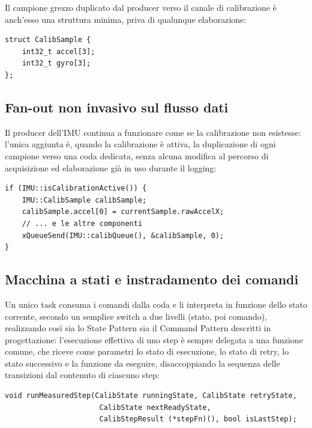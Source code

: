 Il campione grezzo duplicato dal producer verso il canale di calibrazione è
anch'esso una struttura minima, priva di qualunque elaborazione:

\begin{listing}[H]
\begin{verbatim}
struct CalibSample {
    int32_t accel[3];
    int32_t gyro[3];
};
\end{verbatim}
\caption{Campione grezzo instradato al task di calibrazione}
\label{listing:calib-sample}
\end{listing}

\subsection{Fan-out non invasivo sul flusso dati}
Il producer dell'IMU continua a funzionare come se la calibrazione non
esistesse: l'unica aggiunta è, quando la calibrazione è attiva, la
duplicazione di ogni campione verso una coda dedicata, senza alcuna modifica
al percorso di acquisizione ed elaborazione già in uso durante il logging:

\begin{listing}[H]
\begin{verbatim}
if (IMU::isCalibrationActive()) {
    IMU::CalibSample calibSample;
    calibSample.accel[0] = currentSample.rawAccelX;
    // ... e le altre componenti
    xQueueSend(IMU::calibQueue(), &calibSample, 0);
}
\end{verbatim}
\caption{Duplicazione del campione verso il canale di calibrazione}
\label{listing:calib-fanout}
\end{listing}

\subsection{Macchina a stati e instradamento dei comandi}
Un unico task consuma i comandi dalla coda e li interpreta in funzione dello
stato corrente, secondo un semplice switch a due livelli (stato, poi
comando), realizzando così sia lo State Pattern sia il Command Pattern
descritti in progettazione: l'esecuzione effettiva di uno step è sempre
delegata a una funzione comune, che riceve come parametri lo stato di
esecuzione, lo stato di retry, lo stato successivo e la funzione da eseguire,
disaccoppiando la sequenza delle transizioni dal contenuto di ciascuno step:

\begin{listing}[H]
\begin{verbatim}
void runMeasuredStep(CalibState runningState, CalibState retryState,
                      CalibState nextReadyState,
                      CalibStepResult (*stepFn)(), bool isLastStep);
\end{verbatim}
\caption{Firma della funzione comune di esecuzione di uno step}
\label{listing:run-measured-step}
\end{listing}


